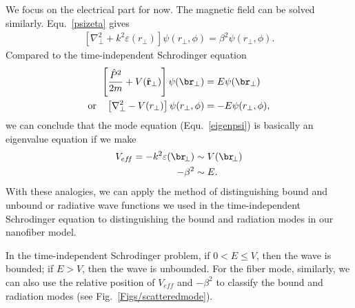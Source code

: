 \documentclass[]{report}
\begin{document}
We focus on the electrical part for now. The magnetic field can be solved similarly. Equ.~\ref{psizeta} 
gives
\begin{align}\label{eigenpsi}
[\nabla^2_\perp + k^2\varepsilon(r_\perp)] \psi(r_\perp, \phi) = \beta^2\psi(r_\perp,\phi).
\end{align}
Compared to the time-independent Schrodinger equation
\begin{align}
\left[\frac{\hat{P}^2}{2m}+V(\hat{\mathbf{r}}_\perp) \right] \psi(\br_\perp)&= E\psi(\br_\perp)\\
\text{or}\quad \left[ \nabla^2_\perp -V(r_\perp) \right] \psi (r_\perp, \phi) &= -E\psi(r_\perp,\phi),
\end{align}
we can conclude that the mode equation (Equ.~\ref{eigenpsi}) is basically an eigenvalue equation if we 
make 
\begin{align}
V_{ef\!f}=-k^2\varepsilon(\br\!_\perp) &\sim V(\br\!_\perp)\\
-\beta^2 &\sim E.
\end{align}
With these analogies, we can apply the method of distinguishing bound and unbound or radiative wave 
functions we used in the time-independent Schrodinger equation to distinguishing the bound and 
radiation modes in our nanofiber model. 

In the time-independent Schrodinger problem, if $ 0<E\leq V $, then the wave is bounded; if $ E>V $, 
then the wave is unbounded. For the fiber mode, similarly, we can also use the relative position of $ 
V_{ef\!f} $ and $ -\beta^2 $ to classify the bound and radiation modes (see 
Fig.~\ref{Figs/scatteredmode}).

\end{document}
